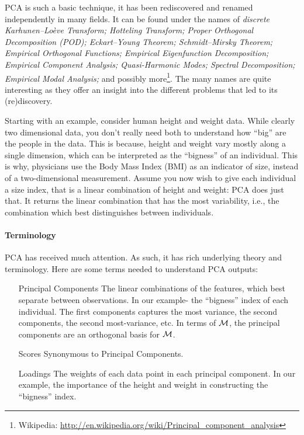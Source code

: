 PCA is such a basic technique, it has been rediscovered and renamed independently in many fields. 
It can be found under the names of \emph{discrete Karhunen–Loève Transform; Hotteling Transform; Proper Orthogonal Decomposition (POD); Eckart–Young Theorem; Schmidt–Mirsky Theorem;  Empirical Orthogonal Functions; Empirical Eigenfunction Decomposition;  Empirical Component Analysis;  Quasi-Harmonic Modes;  Spectral Decomposition;  Empirical Modal Analysis;} and possibly more\footnote{Wikipedia: \url{http://en.wikipedia.org/wiki/Principal_component_analysis} }.
The many names are quite interesting as they offer an insight into the different problems that led to its (re)discovery.

Starting with an example, consider human height and weight data. 
While clearly two dimensional data, you don't really need both to understand how ``big'' are the people in the data. 
This is because, height and weight vary mostly along a single dimension, which can be interpreted as the ``bigness'' of an individual. 
This is why, physicians use the Body Mass Index (BMI) as an indicator of size, instead of a two-dimensional measurement.
Assume you now wish to give each individual a size index, that is a linear combination of height and weight: PCA does just that. It returns the linear combination that has the most variability, i.e., the combination which best distinguishes between individuals. 


\paragraph{Terminology}
PCA has received much attention. As such, it has rich underlying theory and terminology.
Here are some terms needed to understand PCA outputs:
\begin{itemize}
\item[Principal Components] The linear combinations of the features, which best separate between observations. In our example- the ``bigness'' index of each individual. The first components captures the most variance, the second components, the second most-variance, etc. In terms of $\mathcal{M}$, the principal components are an orthogonal basis for $\mathcal{M}$.
\item[Scores] Synonymous to Principal Components.
\item[Loadings] The weights of each data point in each principal component. In our example, the importance of the height and weight in constructing the ``bigness'' index.
\end{itemize}


